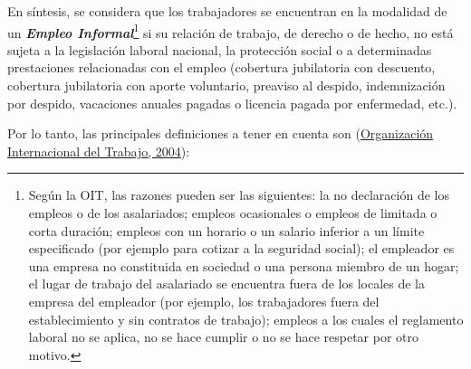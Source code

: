 \documentclass[
  openany]{book}
\begin{document}
En síntesis, se considera que los trabajadores se encuentran en la modalidad de un \textbf{\emph{Empleo Informal}}\footnote{Según la OIT, las razones pueden ser las siguientes: la no declaración de los empleos o de los asalariados; empleos ocasionales o empleos de limitada o corta duración; empleos con un horario o un salario inferior a un límite especificado (por ejemplo para cotizar a la seguridad social); el empleador es una empresa no constituida en sociedad o una persona miembro de un hogar; el lugar de trabajo del asalariado se encuentra fuera de los locales de la empresa del empleador (por ejemplo, los trabajadores fuera del establecimiento y sin contratos de trabajo); empleos a los cuales el reglamento laboral no se aplica, no se hace cumplir o no se hace respetar por otro motivo.} si su relación de trabajo, de derecho o de hecho, no está sujeta a la legislación laboral nacional, la protección social o a determinadas prestaciones relacionadas con el empleo (cobertura jubilatoria con descuento, cobertura jubilatoria con aporte voluntario, preaviso al despido, indemnización por despido, vacaciones anuales pagadas o licencia pagada por enfermedad, etc.).

Por lo tanto, las principales definiciones a tener en cuenta son (\protect\hyperlink{ref-oit2004}{Organización Internacional del Trabajo, 2004}):
\end{document}
